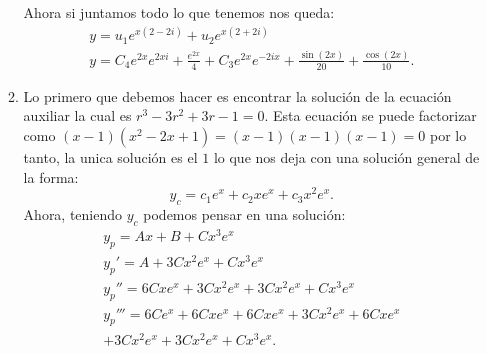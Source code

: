 \begin{enumerate}
\begin{enumerate}
	    Ahora si juntamos todo lo que tenemos nos queda:
	    \begin{align*}
	      y = u_1e^{x\left( 2-2i \right) } + u_2e^{x\left( 2+2i \right) }\\
	      y = C_4e^{2x}e^{2xi}+\frac{e^{2x}}{4}+C_3e^{2x}e^{-2ix}+\frac{\sin\left( 2x \right) }{20}+\frac{\cos\left( 2x \right) }{10}
	    .\end{align*}
	  \item Lo primero que debemos hacer es encontrar la solución de la ecuación auxiliar la cual es $r^{3}-3r^{2}+3r - 1 = 0$. Esta ecuación se puede factorizar como $\left( x-1 \right) \left( x^2-2x+1 \right) = \left( x-1 \right) \left( x-1 \right) \left( x-1 \right) = 0$ por lo tanto, la unica solución es el $1$ lo que nos deja con una solución general de la forma: \[
	  y_c = c_1e^{x}+c_2xe^{x}+c_3x^{2}e^{x}
	  .\] Ahora, teniendo  $y_c$ podemos pensar en una solución:
	  \begin{align*}
	    y_p = Ax + B +Cx^{3}e^{x}\\
	    y_p' = A + 3Cx^2e^{x}+Cx^{3}e^{x}\\
	    y_p'' = 6Cxe^{x}+3Cx^2e^{x}+3Cx^2e^{x}+Cx^{3}e^{x}\\
	    y_p''' = 6Ce^{x} + 6Cxe^{x}+6Cxe^{x}+3Cx^2e^{x}+6Cxe^{x}\\+3Cx^2e^{x}+3Cx^2e^{x}+Cx^{3}e^{x}
	  .\end{align*}


\end{enumerate}
\end{enumerate}
